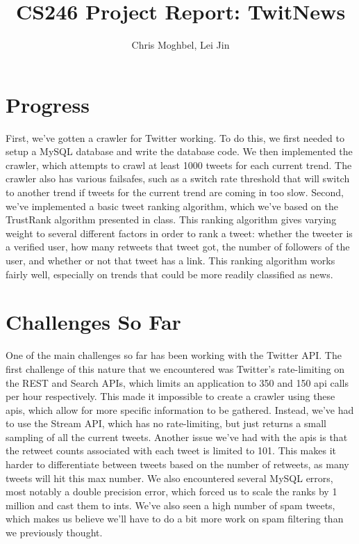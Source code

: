 \documentclass[]{article}
\title{CS246 Project Report: TwitNews}
\author{Chris Moghbel, Lei Jin}
\begin{document}
\maketitle

\section{Progress} 
First, we've gotten a crawler for Twitter working. To do this, we first needed to setup a MySQL database and write the database code. We then implemented the crawler, which attempts to crawl at least 1000 tweets for each current trend. The crawler also has various failsafes, such as a switch rate threshold that will switch to another trend if tweets for the current trend are coming in too slow. Second, we've implemented a basic tweet ranking algorithm, which we've based on the TrustRank algorithm presented in class. This ranking algorithm gives varying weight to several different factors in order to rank a tweet: whether the tweeter is a verified user, how many retweets that tweet got, the number of followers of the user, and whether or not that tweet has a link. This ranking algorithm works fairly well, especially on trends that could be more readily classified as news.

\section{Challenges So Far}
One of the main challenges so far has been working with the Twitter API. The first challenge of this nature that we encountered was Twitter's rate-limiting on the REST and Search APIs, which limits an application to 350 and 150 api calls per hour respectively. This made it impossible to create a crawler using these apis, which allow for more specific information to be gathered. Instead, we've had to use the Stream API, which has no rate-limiting, but just returns a small sampling of all the current tweets. Another issue we've had with the apis is that the retweet counts associated with each tweet is limited to 101. This makes it harder to differentiate between tweets based on the number of retweets, as many tweets will hit this max number. We also encountered several MySQL errors, most notably a double precision error, which forced us to scale the ranks by 1 million and cast them to ints. We've also seen a high number of spam tweets, which makes us believe we'll have to do a bit more work on spam filtering than we previously thought.
\end{document}

